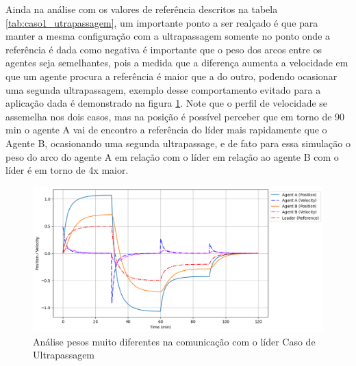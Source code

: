 Ainda na análise com os valores de referência descritos na tabela \ref{tab:caso1_utrapassagem}, um importante ponto a ser realçado é que para manter a mesma configuração com a ultrapassagem somente no ponto onde a referência é dada como negativa é importante que o peso dos arcos entre os agentes seja semelhantes, pois a medida que a diferença aumenta  a velocidade em que um agente procura a referência é maior que a do outro, podendo ocasionar uma segunda ultrapassagem, exemplo desse comportamento evitado para a aplicação dada é demonstrado na figura \ref{fig:case3_fig2}. Note que o perfil de velocidade se assemelha nos dois casos, mas na posição é possível perceber que em torno de 90 min o agente A vai de encontro a referência do líder mais rapidamente que o Agente B, ocasionando uma segunda ultrapassage, e de fato para essa simulação o peso do arco do agente A em relação com o líder em relação ao agente B com o líder é em torno de 4x maior.

\begin{figure}[ht]
    \centering
    \caption{Análise pesos muito diferentes na comunicação com o líder Caso de Ultrapassagem}
    \label{fig:case3_fig2}
    \includegraphics[width=1\linewidth]{figures/Simulation/Cooperativo/case3_fg2.png}
\end{figure}

